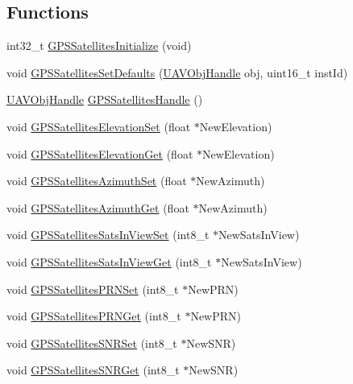 \subsection*{\-Functions}
\begin{DoxyCompactItemize}
\item 
int32\-\_\-t \hyperlink{group___g_p_s_satellites_ga30e61e25b112d528115afb56cd9f56d6}{\-G\-P\-S\-Satellites\-Initialize} (void)
\item 
void \hyperlink{group___g_p_s_satellites_ga68d3e5772c49d696a7939d535ee4de48}{\-G\-P\-S\-Satellites\-Set\-Defaults} (\hyperlink{targets_2_u_a_v_objects_2inc_2uavobjectmanager_8h_a279053e22be53ce9f895043aaeb91e3b}{\-U\-A\-V\-Obj\-Handle} obj, uint16\-\_\-t inst\-Id)
\item 
\hyperlink{targets_2_u_a_v_objects_2inc_2uavobjectmanager_8h_a279053e22be53ce9f895043aaeb91e3b}{\-U\-A\-V\-Obj\-Handle} \hyperlink{group___g_p_s_satellites_ga553351a598284598a8284ee51b0ccd5f}{\-G\-P\-S\-Satellites\-Handle} ()
\item 
void \hyperlink{group___g_p_s_satellites_gaec9c1f150f84a098277059fa5e5bd174}{\-G\-P\-S\-Satellites\-Elevation\-Set} (float $\ast$\-New\-Elevation)
\item 
void \hyperlink{group___g_p_s_satellites_ga8a09f29b5a708e0365ecd0f454d26f50}{\-G\-P\-S\-Satellites\-Elevation\-Get} (float $\ast$\-New\-Elevation)
\item 
void \hyperlink{group___g_p_s_satellites_ga7c829118e4ebc2cf1820b2cf04cb514c}{\-G\-P\-S\-Satellites\-Azimuth\-Set} (float $\ast$\-New\-Azimuth)
\item 
void \hyperlink{group___g_p_s_satellites_ga735a13b7076b28d87e93bc93b09d14b1}{\-G\-P\-S\-Satellites\-Azimuth\-Get} (float $\ast$\-New\-Azimuth)
\item 
void \hyperlink{group___g_p_s_satellites_gaca36d9cecb68f7e24824f48df7833812}{\-G\-P\-S\-Satellites\-Sats\-In\-View\-Set} (int8\-\_\-t $\ast$\-New\-Sats\-In\-View)
\item 
void \hyperlink{group___g_p_s_satellites_ga4778f8c746a1fec7e375a7e5bc574c06}{\-G\-P\-S\-Satellites\-Sats\-In\-View\-Get} (int8\-\_\-t $\ast$\-New\-Sats\-In\-View)
\item 
void \hyperlink{group___g_p_s_satellites_gadab409884be0b0f0c85ed739d74ff5e6}{\-G\-P\-S\-Satellites\-P\-R\-N\-Set} (int8\-\_\-t $\ast$\-New\-P\-R\-N)
\item 
void \hyperlink{group___g_p_s_satellites_gace35b2395644250de6b46ff010a8abff}{\-G\-P\-S\-Satellites\-P\-R\-N\-Get} (int8\-\_\-t $\ast$\-New\-P\-R\-N)
\item 
void \hyperlink{group___g_p_s_satellites_gabda4da1cb9a326ed3c4f00179adf08a5}{\-G\-P\-S\-Satellites\-S\-N\-R\-Set} (int8\-\_\-t $\ast$\-New\-S\-N\-R)
\item 
void \hyperlink{group___g_p_s_satellites_ga400c8cf1b1081d4a8de7c7265c5d6454}{\-G\-P\-S\-Satellites\-S\-N\-R\-Get} (int8\-\_\-t $\ast$\-New\-S\-N\-R)
\end{DoxyCompactItemize}


